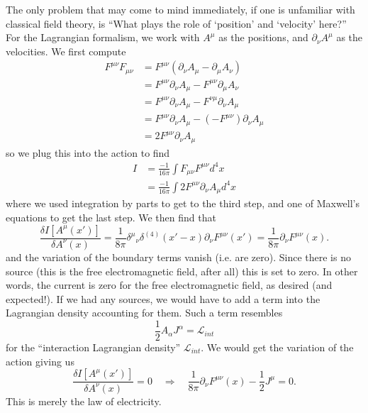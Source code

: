 The only problem that may come to mind immediately, if one is
unfamiliar with classical field theory, is ``What plays the role
of `position' and `velocity' here?'' For the Lagrangian
formalism, we work with $A^{\mu}$ as the positions, and
$\partial_{\nu}A^{\mu}$ as the velocities. We first compute
\begin{subequations}
\begin{align}
F^{\mu\nu}F_{\mu\nu} &= F^{\mu\nu}(\partial_{\nu}A_{\mu}-\partial_{\mu}A_{\nu})\\
&=F^{\mu\nu}\partial_{\nu}A_{\mu}-F^{\mu\nu}\partial_{\mu}A_{\nu}\\
&=F^{\mu\nu}\partial_{\nu}A_{\mu}-F^{\nu\mu}\partial_{\nu}A_{\mu}\\
&=F^{\mu\nu}\partial_{\nu}A_{\mu}-(-F^{\mu\nu})\partial_{\nu}A_{\mu}\\
&=2F^{\mu\nu}\partial_{\nu}A_{\mu}
\end{align}
\end{subequations}
so we plug this into the action to find
\begin{subequations}
\begin{align}
I &= \frac{-1}{16\pi}\int F_{\mu\nu}F^{\mu\nu}d^{4}x\\
&= \frac{-1}{16\pi}\int2F^{\mu\nu}\partial_{\nu}A_{\mu}d^{4}x
\end{align}
\end{subequations}
where we used integration by parts to get to the third step, and
one of Maxwell's equations to get the last step. We then find
that
\begin{equation}%
\frac{\delta I[A^{\mu}(x')]}{\delta A^{\nu}(x)} =
\frac{1}{8\pi}{\delta^{\mu}}_{\nu}\delta^{(4)}(x'-x)\partial_{\nu}F^{\mu\nu}(x') = \frac{1}{8\pi}\partial_{\nu}F^{\mu\nu}(x).
\end{equation}
and the variation of the boundary terms vanish (i.e. are zero).
Since there is no source (this is the free electromagnetic field,
after all) this is set to zero. In other words, the current is
zero for the free electromagnetic field, as desired (and
expected!). If we had any sources, we would have to add a term
into the Lagrangian density accounting for them. Such a term
resembles
\begin{equation}%
\frac{1}{2}A_{\alpha}J^{\alpha} = \mathcal{L}_{int}
\end{equation}
for the ``interaction Lagrangian density''
$\mathcal{L}_{int}$. We would get the variation of the action
giving us
\begin{equation}%
\frac{\delta I[A^{\mu}(x')]}{\delta A^{\nu}(x)} = 0\quad\Rightarrow\quad
\frac{1}{8\pi}\partial_{\nu}F^{\mu\nu}(x) - \frac{1}{2}J^{\mu} = 0.
\end{equation}
This is merely the law of electricity.

